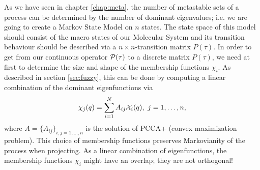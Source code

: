 As we have seen in chapter \ref{chap:meta}, the number of metastable sets of a process can be determined by the number of dominant eigenvalues; i.e. we are going to create a Markov State Model on $n$ states.
The state space of this model should consist of the macro states of our Molecular System and its transition behaviour should be described via a $n\times n$-transition matrix $P(\tau)$. 
In order to get from our continuous operator $\mathcal{P}(\tau)$ to a discrete matrix $P(\tau)$, we need at first to determine the size and shape of the membership functions  $\chi_i$.
As described in section \ref{sec:fuzzy}, this can be done by computing a linear combination of the dominant eigenfunctions via
\begin{equation}
\label{eq:pcca_membership}
\chi_j(q) = \sum_{i=1}^N A_{ij}\mathcal{X}_i(q), \ j=1,\dots,n,
\end{equation}
where $A= \{A_{ij}\}_{i,j=1,\dots,n}$ is the solution of PCCA+ (convex maximization problem).
This choice of membership functions preserves Markovianity of the process when projecting. 
As a linear combination of eigenfunctions, the membership functions $\chi_i$ might have an overlap; they are not orthogonal!

